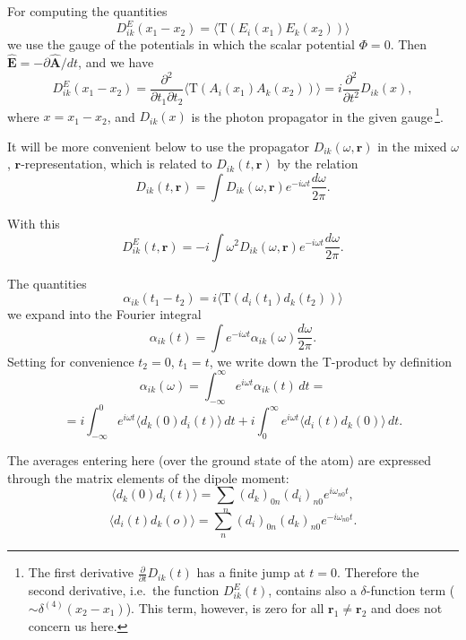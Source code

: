 For computing the quantities
\begin{equation}
D_{ik}^E(x_1-x_2) = \langle\mathrm{T}(E_i(x_1)E_k(x_2))\rangle
\tag{85.8}
\end{equation}
we use the gauge of the potentials in which the scalar potential $\Phi = 0$. Then $\hat{\mathbf{E}} = -\partial\hat{\mathbf{A}}/dt$, and we have
\[
D_{ik}^E(x_1-x_2) = \frac{\partial^2}{\partial t_1\partial t_2}\langle\mathrm{T}(A_i(x_1)A_k(x_2))\rangle = i\frac{\partial^2}{\partial t^2}D_{ik}(x),
\]
where $x = x_1 - x_2$, and $D_{ik}(x)$ is the photon propagator in the given gauge\,\footnote{The first derivative $\frac{\partial}{\partial t}D_{ik}(t)$ has a finite jump at $t = 0$. Therefore the second derivative, i.e.\ the function $D_{ik}^E(t)$, contains also a $\delta$-function term ($\sim\delta^{(4)}(x_2-x_1)$). This term, however, is zero for all $\mathbf{r}_1 \neq \mathbf{r}_2$ and does not concern us here.}.

It will be more convenient below to use the propagator $D_{ik}(\omega, \mathbf{r})$ in the mixed $\omega$, $\mathbf{r}$-representation, which is related to $D_{ik}(t, \mathbf{r})$ by the relation
\[
D_{ik}(t,\mathbf{r}) = \int D_{ik}(\omega,\mathbf{r})e^{-i\omega t}\frac{d\omega}{2\pi}.
\]

With this
\begin{equation}
D_{ik}^E(t,\mathbf{r}) = -i\int\omega^2 D_{ik}(\omega,\mathbf{r})e^{-i\omega t}\frac{d\omega}{2\pi}.
\tag{85.9}
\end{equation}

The quantities
\begin{equation}
\alpha_{ik}(t_1-t_2) = i\langle\mathrm{T}(d_i(t_1)d_k(t_2))\rangle
\tag{85.10}
\end{equation}
we expand into the Fourier integral
\[
\alpha_{ik}(t) = \int e^{-i\omega t}\alpha_{ik}(\omega)\frac{d\omega}{2\pi}.
\]
Setting for convenience $t_2 = 0$, $t_1 = t$, we write down the T-product by definition
\begin{equation}
\alpha_{ik}(\omega) = \int_{-\infty}^{\infty}e^{i\omega t}\alpha_{ik}(t)\,dt =
\end{equation}
\[
= i\int_{-\infty}^{0}e^{i\omega t}\langle d_k(0)d_i(t)\rangle\,dt + i\int_0^\infty e^{i\omega t}\langle d_i(t)d_k(0)\rangle\,dt.
\tag{85.11}
\]

The averages entering here (over the ground state of the atom) are expressed through the matrix elements of the dipole moment:
\[
\langle d_k(0)d_i(t)\rangle = \sum_n(d_k)_{0n}(d_i)_{n0}e^{i\omega_{n0}t},
\]
\[
\langle d_i(t)d_k(o)\rangle = \sum_n(d_i)_{0n}(d_k)_{n0}e^{-i\omega_{n0}t}.
\]

